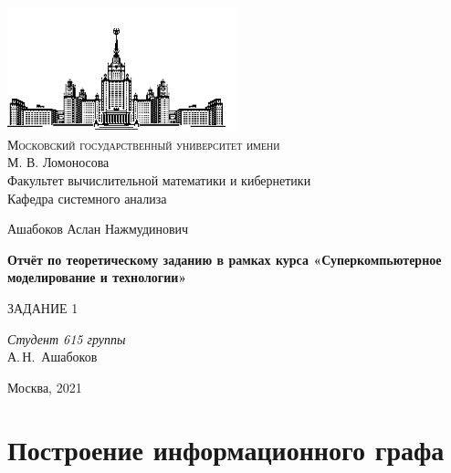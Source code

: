 \documentclass[a4paper, 12pt]{article}
\begin{document}
\thispagestyle{empty}

\begin{center}
\vspace{-3cm}
\includegraphics[width=0.5\textwidth]{src/msu.png}\\
{\scshape Московский государственный университет имени}\\
М. В. Ломоносова\\
Факультет вычислительной математики и кибернетики\\
Кафедра системного анализа

\vfill

{\LARGE Ашабоков Аслан Нажмудинович}

\vspace{1cm}

{\Huge\bfseries Отчёт по теоретическому заданию в рамках курса
«Суперкомпьютерное моделирование и технологии»}\\

\vspace{1cm}

{\LARGE ЗАДАНИЕ 1}
\end{center}

\vspace{1cm}

\begin{flushright}
  \large
  \textit{Студент 615 группы}\\
  А.\,Н.~Ашабоков

  \vspace{5mm}

\end{flushright}

\vfill

\begin{center}
Москва, 2021
\end{center}

\newpage
\setcounter{tocdepth}{2}
\tableofcontents

\newpage
\normalsize

\section{Построение информационного графа}
\end{document}
